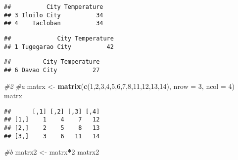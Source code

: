 \documentclass[
]{article}
\newenvironment{Shaded}{\begin{snugshade}}{\end{snugshade}}
\newcommand{\AttributeTok}[1]{\textcolor[rgb]{0.13,0.29,0.53}{#1}}
\newcommand{\CommentTok}[1]{\textcolor[rgb]{0.56,0.35,0.01}{\textit{#1}}}
\newcommand{\DecValTok}[1]{\textcolor[rgb]{0.00,0.00,0.81}{#1}}
\newcommand{\FunctionTok}[1]{\textcolor[rgb]{0.13,0.29,0.53}{\textbf{#1}}}
\newcommand{\NormalTok}[1]{#1}
\newcommand{\OtherTok}[1]{\textcolor[rgb]{0.56,0.35,0.01}{#1}}
\newcommand{\SpecialCharTok}[1]{\textcolor[rgb]{0.81,0.36,0.00}{\textbf{#1}}}
\begin{document}
\begin{verbatim}
##          City Temperature
## 3 Iloilo City          34
## 4    Tacloban          34
\end{verbatim}

\begin{Shaded}
\end{Shaded}

\begin{verbatim}
##             City Temperature
## 1 Tugegarao City          42
\end{verbatim}

\begin{Shaded}
\end{Shaded}

\begin{verbatim}
##         City Temperature
## 6 Davao City          27
\end{verbatim}

\begin{Shaded}
\begin{Highlighting}[]
\CommentTok{\#2}
\CommentTok{\#a}
\NormalTok{matrx }\OtherTok{\textless{}{-}} \FunctionTok{matrix}\NormalTok{(}\FunctionTok{c}\NormalTok{(}\DecValTok{1}\NormalTok{,}\DecValTok{2}\NormalTok{,}\DecValTok{3}\NormalTok{,}\DecValTok{4}\NormalTok{,}\DecValTok{5}\NormalTok{,}\DecValTok{6}\NormalTok{,}\DecValTok{7}\NormalTok{,}\DecValTok{8}\NormalTok{,}\DecValTok{11}\NormalTok{,}\DecValTok{12}\NormalTok{,}\DecValTok{13}\NormalTok{,}\DecValTok{14}\NormalTok{), }\AttributeTok{nrow =}  \DecValTok{3}\NormalTok{, }\AttributeTok{ncol =} \DecValTok{4}\NormalTok{)}
\NormalTok{matrx}
\end{Highlighting}
\end{Shaded}

\begin{verbatim}
##      [,1] [,2] [,3] [,4]
## [1,]    1    4    7   12
## [2,]    2    5    8   13
## [3,]    3    6   11   14
\end{verbatim}

\begin{Shaded}
\begin{Highlighting}[]
\CommentTok{\#b}
\NormalTok{matrx2 }\OtherTok{\textless{}{-}}\NormalTok{ matrx}\SpecialCharTok{*}\DecValTok{2}
\NormalTok{matrx2}
\end{Highlighting}
\end{Shaded}
\end{document}

